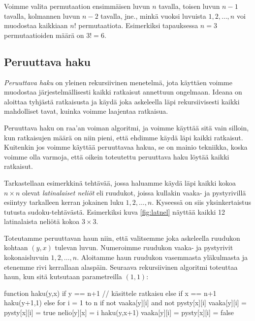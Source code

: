 Voimme valita permutaation ensimmäisen luvun $n$ tavalla,
toisen luvun $n-1$ tavalla,
kolmannen luvun $n-2$ tavalla, jne.,
minkä vuoksi luvuista $1,2,\dots,n$ voi muodostaa
kaikkiaan $n!$ permutaatiota.
Esimerkiksi tapauksessa $n=3$ permutaatioiden määrä on $3!=6$.

\subsection{Peruuttava haku}


\emph{Peruuttava haku} on yleinen rekursiivinen menetelmä,
jota käyttäen voimme muodostaa järjestelmällisesti
kaikki ratkaisut annettuun ongelmaan.
Ideana on aloittaa tyhjästä ratkaisusta ja käydä
joka askeleella läpi rekursiivisesti kaikki mahdolliset tavat,
kuinka voimme laajentaa ratkaisua.

Peruuttava haku on raa'an voiman algoritmi,
ja voimme käyttää sitä vain silloin,
kun ratkaisujen määrä on niin pieni,
että ehdimme käydä läpi kaikki ratkaisut.
Kuitenkin jos voimme käyttää peruuttavaa hakua,
se on mainio tekniikka,
koska voimme olla varmoja, että oikein toteutettu
peruuttava haku löytää kaikki ratkaisut.


Tarkastellaan esimerkkinä tehtävää, jossa haluamme käydä läpi
kaikki kokoa $n \times n$ olevat \emph{latinalaiset neliöt}
eli ruudukot, joissa kullakin vaaka- ja pystyrivillä
esiintyy tarkalleen kerran jokainen luku $1,2,\dots,n$.
Kyseessä on siis yksinkertaistus tutusta sudoku-tehtävästä.
Esimerkiksi kuva \ref{fig:latnel} näyttää kaikki 12 latinalaista neliötä kokoa $3 \times 3$.

Toteutamme peruuttavan haun niin, että valitsemme joka askeleella
ruudukon kohtaan $(y,x)$ tulevan luvun.
Numeroimme ruudukon vaaka- ja pystyrivit kokonaisluvuin $1,2,\dots,n$.
Aloitamme haun ruudukon vasemmasta yläkul\-masta ja etenemme
rivi kerrallaan alaspäin.
Seuraava rekursiivinen algoritmi toteuttaa haun,
kun sitä kutsutaan parametreilla $(1,1)$:

\begin{code}
function haku(y,x)
    if y == n+1
        // käsittele ratkaisu
    else if x == n+1
        haku(y+1,1)
    else
        for i = 1 to n
            if not vaaka[y][i] and not pysty[x][i]
                vaaka[y][i] = pysty[x][i] = true
                nelio[y][x] = i
                haku(y,x+1)
                vaaka[y][i] = pysty[x][i] = false
\end{code}

